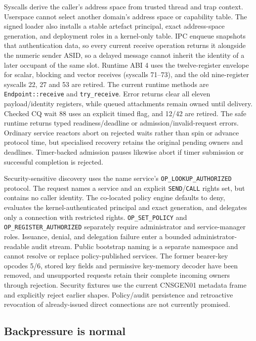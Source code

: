 Syscalls derive the caller's address space from trusted thread and trap context.
Userspace cannot select another domain's address space or capability table.
The signed loader also installs a stable artefact principal, exact address-space
generation, and deployment roles in a kernel-only table. IPC enqueue snapshots
that authentication data, so every current receive operation returns it
alongside the numeric sender ASID, so a delayed message cannot inherit the
identity of a later occupant of the same slot. Runtime ABI 4 uses the twelve-register
envelope for scalar, blocking and vector receives (syscalls 71--73), and the old
nine-register syscalls 22, 27 and 53 are retired. The current runtime methods
are \texttt{Endpoint::receive} and \texttt{try\_receive}. Error returns clear all
eleven payload/identity registers, while queued attachments remain owned until
delivery. Checked CQ wait 88 uses an explicit timed flag, and 12/42 are retired.
The safe runtime returns typed readiness/deadline or admission/invalid-request
errors. Ordinary service reactors abort on rejected waits rather than spin or
advance protocol time, but specialised recovery retains the original pending owners
and deadlines. Timer-backed admission pauses likewise abort if timer
submission or successful completion is rejected.

Security-sensitive discovery uses the name service's
\texttt{OP\_LOOKUP\_AUTHORIZED} protocol. The request names a service and an
explicit \texttt{SEND}/\texttt{CALL} rights set, but contains no caller identity.
The co-located policy engine defaults to deny, evaluates the kernel-authenticated
principal and exact generation, and delegates only a connection with restricted rights.
\texttt{OP\_SET\_POLICY} and \texttt{OP\_REGISTER\_AUTHORIZED} separately require
administrator and service-manager roles. Issuance, denial, and delegation
failure enter a bounded administrator-readable audit stream. Public bootstrap
naming is a separate namespace and cannot resolve or replace policy-published
services. The former bearer-key opcodes 5/6, stored key fields and permissive
key-memory decoder have been removed, and unsupported requests retain their complete
incoming owners through rejection. Security fixtures use the current CNSGEN01
metadata frame and explicitly reject earlier shapes. Policy/audit persistence and retroactive
revocation of already-issued direct connections are not currently promised.

\subsection{Backpressure is normal}

